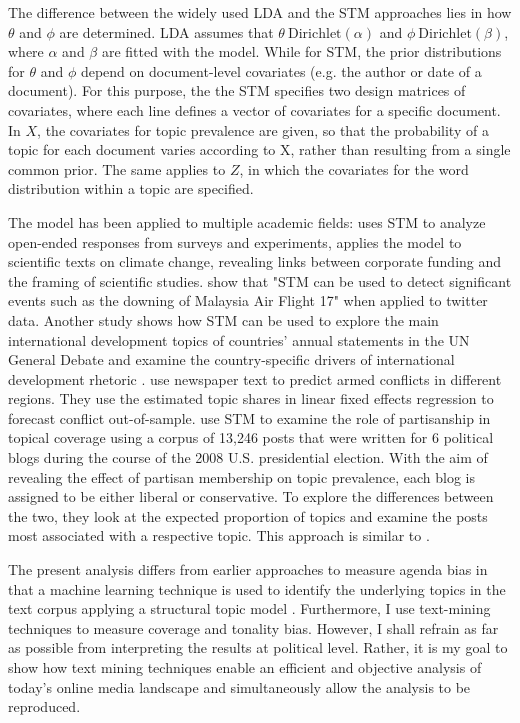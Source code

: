 \documentclass[12pt,a4paper,notitlepage]{article}
\begin{document}
The difference between the widely used LDA and the STM approaches lies in how $\theta$ and $\phi$ are determined. LDA assumes that $\theta ~ \text{Dirichlet}(\alpha)$ and $\phi ~ \text{Dirichlet}(\beta)$, where $\alpha$ and $\beta$ are fitted with the model. While for STM, the prior distributions for $\theta$ and $\phi$ depend on document-level covariates (e.g. the author or date of a document). For this purpose, the the STM specifies two design matrices of covariates, where each line defines a vector of covariates for a specific document.  In $X$, the covariates for topic prevalence are given, so that the probability of a topic for each document varies according to X, rather than resulting from a single common prior. The same applies to $Z$, in which the covariates for the word distribution within a topic are specified. 

The model has been applied to multiple academic fields: \citet{roberts_structural_2014} uses STM to analyze open-ended responses from surveys and experiments, \citet{farrell_corporate_2016} applies the model to scientific texts on climate change, revealing links between corporate funding and the framing of scientific studies. \citet{mishler_using_2015} show that "STM can be used to detect significant events such as the downing of Malaysia Air Flight 17" when applied to twitter data. Another study shows how STM can be used to explore the main international development topics of countries' annual statements in the UN General Debate and examine the country-specific drivers of international development rhetoric \citep{baturo_what_2017}. \citet{mueller_reading_2016} use newspaper text to predict armed conflicts in different regions. They use the estimated topic shares in linear fixed effects regression to forecast conflict out-of-sample. \citet{roberts_navigating_2016} use STM to examine the role of partisanship in topical coverage using a corpus of 13,246 posts that were written for 6 political blogs during the course of the 2008 U.S. presidential election. With the aim of revealing the effect of partisan membership on topic prevalence, each blog is assigned to be either liberal or conservative. To explore the differences between the two, they look at the expected proportion of topics and examine the posts most associated with a respective topic. This approach is similar to \citet{roberts_model_2016}. 

The present analysis differs from earlier approaches to measure agenda bias in that a machine learning technique is used to identify the underlying topics in the text corpus applying a structural topic model \citep{roberts_model_2016}. Furthermore, I use text-mining techniques to measure coverage and tonality bias. However, I shall refrain as far as possible from interpreting the results at political level. Rather, it is my goal to show how text mining techniques enable an efficient and objective analysis of today's online media landscape and simultaneously allow the analysis to be reproduced. 
 
\end{document}
